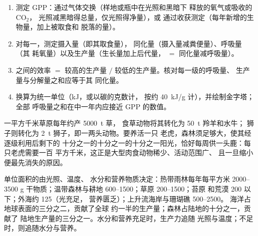 \begin{method}[编制能量收支]\label{met:b1:ecosystem-organization:budget}
\begin{enumerate}
  \item 测定 GPP：通过气体交换（样地或瓶中在光照和黑暗下
        释放的氧气或吸收的 $\mathrm{CO_2}$，
        光照减黑暗得总量，仅光照得净量），或
        通过收获测定（每年新增的生物量，加上被取食和
        脱落的量）。
  \item 对每一，测定摄入量（即其取食量），
        同化量（摄入量减粪便量）、呼吸量（其
        耗氧量）以及生产量（生长量加上后代量，
        $=$ 同化量减呼吸量）。
  \item {}之间的效率 $=$ 较高的生产量
        $/$ 较低的生产量。核对每一级的呼吸量、
        生产量与分解量之和应等于其
        同化量。
  \item 换算为统一单位（\unit{kJ}，或以碳的克数计，
        按约 \qty{40}{kJ/g} 计），并绘制金字塔；全部
        呼吸量之和在中一年内应接近 GPP
        的数值。
\end{enumerate}
\end{method}

\begin{example}[为何顶层稀少]\label{ex:b1:ecosystem-organization:top}
一平方千米草原每年约产 \qty{5000}{t} 草，
食草动物将其转化为 \qty{50}{t} 羚羊和水牛；
狮子则转化为 \qty{2}{t} 狮子，即一两头动物。要养活一只
老虎，森林须足够大，使其经逐级利用后剩下的
十分之一的十分之一的十分之一阳光，恰好每周供一头鹿：每只老虎需要一百
平方千米，这正是大型肉食动物稀少、活动范围广、
且一旦缩小便最先消失的原因。
\end{example}

\begin{proposition}[各生物群系的生产力]\label{prop:b1:ecosystem-organization:biomes}
单位面积的由光照、温度、
水分和营养物质决定：热带雨林每年每平方米 \qtyrange{2000}{3500}{} g
干物质；温带森林与耕地
\qtyrange{600}{1500}{}；草原 \qtyrange{200}{1500}{}；苔原
和荒漠 \qty{200}{} 以下；外海约 \qty{125}{}（光充足，
营养匮乏）；上升流海岸与珊瑚礁 \qtyrange{500}{2500}{}。
海洋占地球表面的三分之二，贡献了全球
约一半的生产量；森林占陆地的十分之一，贡献了
陆地生产量的三分之一。水分和营养充足时，生产力追随
光照与温度；不足时，则追随水分与营养。
\end{proposition}

